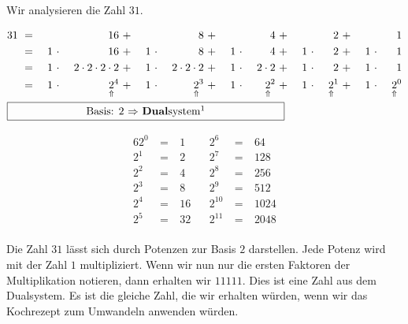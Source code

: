 \begin{example}

Wir analysieren die Zahl $31$.

\begin{minipage}{0.6\textwidth}
\begin{alignat*}{16}
31 & ~ = ~ & & & 16 & ~ + ~ & & & 8 & ~ + ~ & & & 4 & ~ + ~ & & & 2 & ~ + ~ & & & 1 \\
& ~ = ~ & 1 & ~\cdot~ & 16 & ~ + ~ & 1 & ~\cdot~ & 8 & ~ + ~ & 1 & ~\cdot~ & 4 & ~ + ~ & 1 & ~\cdot~ & 2 & ~ + ~ & 1 & ~\cdot~ & 1 \\
& ~ = ~ & 1 & ~\cdot~ & 2 \cdot 2 \cdot 2 \cdot 2  & ~ + ~ & 1 & ~\cdot~ & 2 \cdot 2 \cdot 2  & ~ + ~ & 1 & ~\cdot~ & 2 \cdot 2 & ~ + ~ & 1 & ~\cdot~ & 2 & ~ + ~ & 1 & ~\cdot~ & 1 \\
& ~ = ~ & 1 & ~\cdot~ & \underset{\Uparrow}{2}^4  & ~ + ~ & 1 & ~\cdot~ & \underset{\Uparrow}{2}^3  & ~ + ~ & 1 & ~\cdot~ & \underset{\Uparrow}{2}^2 & ~ + ~ & 1 & ~\cdot~ & \underset{\Uparrow}{2}^1 & ~ + ~ & 1 & ~\cdot~ & \underset{\Uparrow}{2}^0 \\
\omit\rlap{\framebox[9cm]{Basis: $2$ $\Rightarrow$ \textbf{Dual}system\footnotemark}}
\end{alignat*}
\end{minipage}
\hfill
\begin{minipage}{0.35\textwidth}
\begin{alignat*}{6}
2^0 & ~ = ~ & 1 & ~~~~ 	2^6 & ~ = ~ & 64  \\
2^1 & ~ = ~ & 2	 & ~~~~	2^7 & ~ = ~ & 128  \\
2^2 & ~ = ~ & 4	 & ~~~~	2^8 & ~ = ~ & 256  \\
2^3 & ~ = ~ & 8	 & ~~~~	2^9 & ~ = ~ & 512  \\
2^4 & ~ = ~ & 16 &~~~~ 	2^{10} & ~ = ~ & 1024  \\
2^5 & ~ = ~ & 32 &~~~~ 	2^{11} & ~ = ~ & 2048  \\
\end{alignat*}
\end{minipage}
Die Zahl $31$ lässt sich durch Potenzen zur Basis $2$ darstellen. Jede Potenz wird mit der Zahl $1$ multipliziert.  Wenn wir nun nur die ersten Faktoren der Multiplikation notieren, dann erhalten wir $11111$. Dies ist eine Zahl aus dem Dualsystem. Es ist die gleiche Zahl, die wir erhalten würden, wenn wir das Kochrezept zum Umwandeln anwenden würden.

\end{example}


